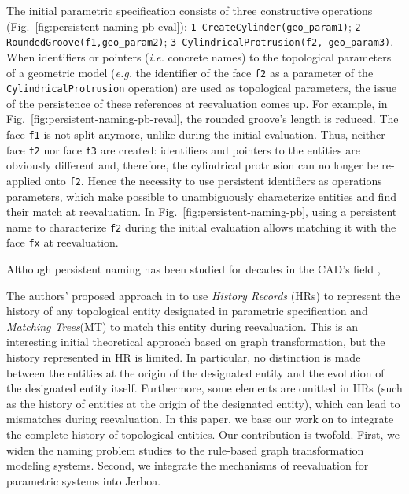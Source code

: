 The initial parametric specification consists of three constructive operations (Fig.~\ref{fig:persistent-naming-pb-eval}):
\texttt{1-CreateCylinder(geo\_param1)}; \texttt{2-RoundedGroove(f1,geo\_param2)}; \texttt{3-Cy\-lin\-dri\-cal\-Pro\-tru\-sion(f2, geo\_param3)}.
When identifiers
or pointers (\textit{i.e.} concrete names) to the topological parameters of a geometric
model (\textit{e.g.} the identifier of the face \verb+f2+ as a parameter of
the \verb+CylindricalProtrusion+ operation) are used as topological
parameters, the issue of the persistence of these references at
reevaluation comes up. For example, in Fig.~\ref{fig:persistent-naming-pb-reval},
the rounded groove’s length is reduced. The
face \verb+f1+ is not split  anymore, unlike  during
the initial evaluation. Thus, neither face \verb+f2+ nor face \verb+f3+ are created:  identifiers and pointers to the entities are obviously different and, therefore, the cylindrical protrusion can
no longer be re-applied onto \verb+f2+.
Hence the necessity to use persistent
identifiers as operations parameters, which make possible to
unambiguously characterize entities and find their match at
reevaluation. In Fig.~\ref{fig:persistent-naming-pb}, using a persistent name to characterize
\verb+f2+ %
during the initial evaluation  allows %
matching
it with the face \verb+fx+ at reevaluation.

Although persistent naming has been studied for decades in the CAD's
field \cite{KRIPAC1997,CAPOYLEAS199617,wu2001face,wang2005geometry,bidarra2005feature,mun05,mar06,baba10,xue16,farjana2018mechanisms},

The authors' proposed approach in \cite{cardot2019persistent} to use \emph{History Records} (HRs) to represent the history of any topological entity designated in parametric specification and \emph{Matching Trees}(MT) to match this entity during reevaluation.
This is an interesting initial theoretical approach based on graph transformation, but the history represented in HR is limited.
In particular, no distinction is made between the entities at the origin of the designated entity and the evolution of the designated entity itself.
Furthermore, some elements are omitted in HRs (such as the history of entities at the origin of the designated entity), which can lead to mismatches during reevaluation.
In this paper, we base our work on \cite{gaide2023model} to integrate the complete history of topological entities.
Our contribution is twofold. First, we widen the naming problem studies to the rule-based graph transformation modeling systems.
Second, we integrate the mechanisms of reevaluation for parametric systems into Jerboa.

